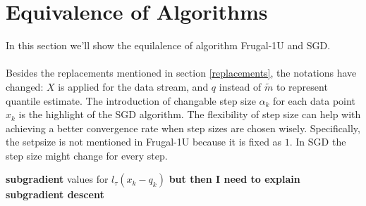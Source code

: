 \section{Equivalence of Algorithms}
In this section we'll show the equilalence of algorithm Frugal-1U 
and SGD.
\\\\
Besides the replacements mentioned in section \ref{replacements},
the notations have changed: 
$X$ is applied for the data stream, and $q$ instead of $\tilde{m}$
to represent quantile estimate.
The introduction of changable step size $\alpha_k$ for each data point $x_k$
is the highlight of the SGD algorithm. The flexibility of step size can help
with achieving a better convergence rate when step sizes are chosen wisely.
Specifically, the setpsize is not mentioned in Frugal-1U 
because it is fixed as $1$. In SGD the step size might change for every step.


\textbf{subgradient} values for $l_\tau(x_k - q_k)$ 
{\color{red} \textbf{but then I need to explain subgradient descent}} 

